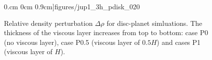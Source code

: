 \begin{figure}
     0.cm 0cm 0.9cm]{figures/jup1_3h_pdisk_020}\\
   \caption{Relative density perturbation $\Delta\rho$ for disc-planet
     simluations. The thickness of the viscous layer increases from
     top to bottom: case P0 (no viscous layer), case P0.5 (viscous
     layer of $0.5H$) and cases P1 (viscous layer of $H$). 
     \label{jup0_3h}}
\end{figure}
 


